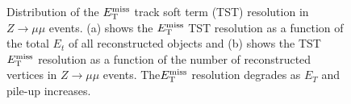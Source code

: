\begin{figure}[h!]
\begin{center}
\begin{subfigure}[b]{0.40\textwidth}
    \caption{ }
    \end{subfigure}
\end{center}
\caption[Distribution of the $\met$ track soft term (TST) resolution in $Z\rightarrow \mu\mu$ events]{Distribution of the $\met$ track soft term (TST) resolution in $Z\rightarrow \mu\mu$ events.\cite{METReco} (a) shows the $\met$ TST resolution as a function of the total $E_t$ of all reconstructed objects and (b) shows the TST $\met$ resolution as a function of the number of reconstructed vertices in $Z\rightarrow \mu\mu$ events.  The$\met$ resolution degrades as $E_T$ and pile-up increases.}
\label{fig:MET_reso} 
\end{figure}






